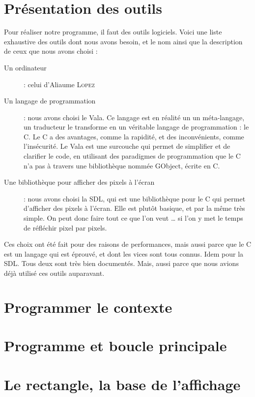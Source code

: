 \section{Présentation des outils}
  Pour réaliser notre programme, il faut des outils logiciels.
  Voici une liste exhaustive des outils dont nous avons besoin, et le 
  nom ainsi que la description de ceux que nous avons choisi : 
    \begin{description}
      \item[Un ordinateur] : celui d'Aliaume \textsc{Lopez}
      \item[Un langage de programmation] : nous avons choisi le Vala. Ce langage est en réalité un
        un méta-langage, un traducteur le transforme en un véritable langage de programmation : le C.
        Le C a des avantages, comme la rapidité, et des inconvénients, comme l'insécurité. Le Vala est une 
        surcouche qui permet de simplifier et de clarifier le code, en utilisant des paradigmes de programmation
        que le C n'a pas à travers une bibliothèque nommée GObject, écrite en C.
      \item[Une bibliothèque pour afficher des pixels à l'écran] : nous avons choisi la SDL, qui est une bibliothèque pour le C qui permet d'afficher des pixels à l'écran. Elle est plutôt basique, et par la même très simple. On peut donc faire tout ce que l'on veut … si l'on y met le temps de réfléchir pixel par pixels.
    \end{description}
  
  Ces choix ont été fait pour des raisons de performances, mais aussi parce que le C est un langage qui est éprouvé, et dont les vices sont tous connus. Idem pour la SDL. Tous deux sont très bien documentés. Mais, aussi parce que nous avions déjà utilisé ces outils auparavant.

\section{Programmer le contexte}
  

\section{Programme et boucle principale}
  
\section{Le rectangle, la base de l'affichage}
  

